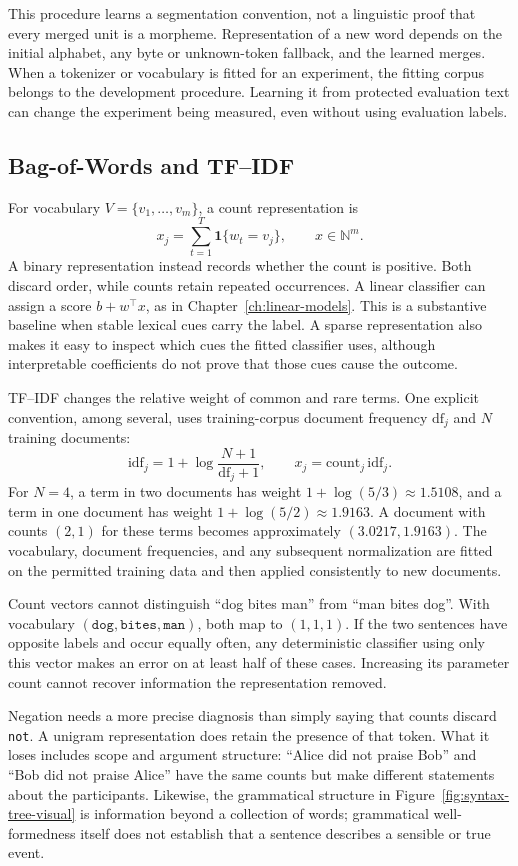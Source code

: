 This procedure learns a segmentation convention, not a linguistic proof that every merged unit is a morpheme. Representation of a new word depends on the initial alphabet, any byte or unknown-token fallback, and the learned merges. When a tokenizer or vocabulary is fitted for an experiment, the fitting corpus belongs to the development procedure. Learning it from protected evaluation text can change the experiment being measured, even without using evaluation labels.

\subsection{Bag-of-Words and TF--IDF}

For vocabulary $V=\{v_1,\ldots,v_m\}$, a count representation is
\[
 x_j=\sum_{t=1}^{T}\mathbf 1\{w_t=v_j\},\qquad x\in\mathbb N^m.
\]
A binary representation instead records whether the count is positive. Both discard order, while counts retain repeated occurrences. A linear classifier can assign a score $b+w^\top x$, as in Chapter~\ref{ch:linear-models}. This is a substantive baseline when stable lexical cues carry the label. A sparse representation also makes it easy to inspect which cues the fitted classifier uses, although interpretable coefficients do not prove that those cues cause the outcome.

TF--IDF changes the relative weight of common and rare terms. One explicit convention, among several, uses training-corpus document frequency $\mathrm{df}_j$ and $N$ training documents:
\[
 \mathrm{idf}_j=1+\log\frac{N+1}{\mathrm{df}_j+1},
 \qquad x_j=\mathrm{count}_j\,\mathrm{idf}_j.
\]
For $N=4$, a term in two documents has weight $1+\log(5/3)\approx1.5108$, and a term in one document has weight $1+\log(5/2)\approx1.9163$. A document with counts $(2,1)$ for these terms becomes approximately $(3.0217,1.9163)$. The vocabulary, document frequencies, and any subsequent normalization are fitted on the permitted training data and then applied consistently to new documents.

Count vectors cannot distinguish ``dog bites man'' from ``man bites dog''. With vocabulary $(\texttt{dog},\texttt{bites},\texttt{man})$, both map to $(1,1,1)$. If the two sentences have opposite labels and occur equally often, any deterministic classifier using only this vector makes an error on at least half of these cases. Increasing its parameter count cannot recover information the representation removed.

Negation needs a more precise diagnosis than simply saying that counts discard \texttt{not}. A unigram representation does retain the presence of that token. What it loses includes scope and argument structure: ``Alice did not praise Bob'' and ``Bob did not praise Alice'' have the same counts but make different statements about the participants. Likewise, the grammatical structure in Figure~\ref{fig:syntax-tree-visual} is information beyond a collection of words; grammatical well-formedness itself does not establish that a sentence describes a sensible or true event.

